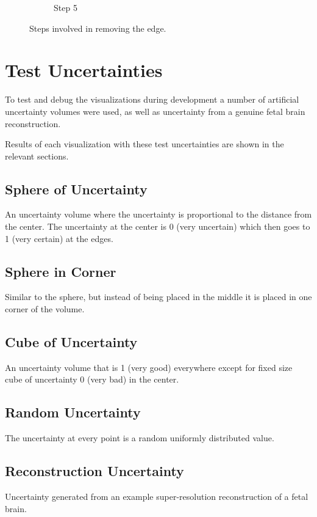 \begin{figure}[h]
\begin{subfigure}[b]{0.3\textwidth}
    \caption{Step 5}
    \label{fig:erosion5}
  \end{subfigure}  
  \caption{Steps involved in removing the edge.}\label{fig:erosionoverview}
\end{figure}

\newpage
\section{Test Uncertainties}\label{section:testuncertainties}

To test and debug the visualizations during development a number of artificial uncertainty volumes were used, as well as uncertainty from a genuine fetal brain reconstruction.

Results of each visualization with these test uncertainties are shown in the relevant sections.

\subsection*{Sphere of Uncertainty}
An uncertainty volume where the uncertainty is proportional to the distance from the center. The uncertainty at the center is 0 (very uncertain) which then goes to 1 (very certain) at the edges.

\subsection*{Sphere in Corner}
Similar to the sphere, but instead of being placed in the middle it is placed in one corner of the volume.

\subsection*{Cube of Uncertainty}
An uncertainty volume that is 1 (very good) everywhere except for fixed size cube of uncertainty 0 (very bad) in the center.

\subsection*{Random Uncertainty}
The uncertainty at every point is a random uniformly distributed value.

\subsection*{Reconstruction Uncertainty}
Uncertainty generated from an example super-resolution reconstruction of a fetal brain.\\

